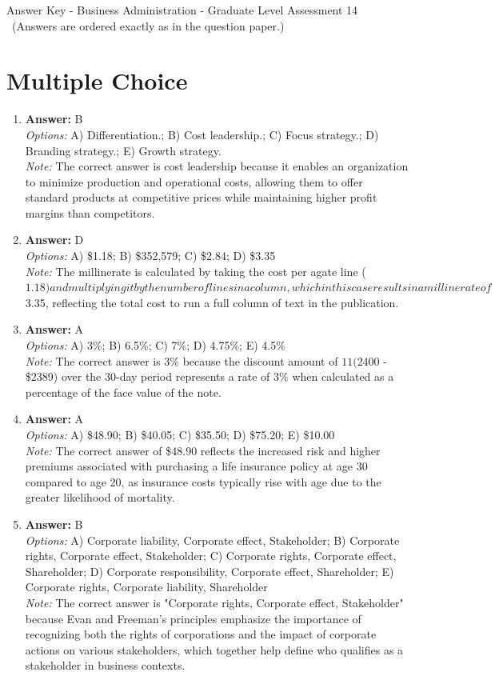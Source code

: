 \documentclass[12pt]{article}
\begin{document}
\begin{center}
Answer Key - Business Administration - Graduate Level Assessment 14 \
\small (Answers are ordered exactly as in the question paper.)
\end{center}

\section*{Multiple Choice}
\begin{enumerate}[label=\arabic*.]
\item \textbf{Answer:} B
\\ \textit{Options:} A) Differentiation.; B) Cost leadership.; C) Focus strategy.; D) Branding strategy.; E) Growth strategy.
\\ \textit{Note:} The correct answer is cost leadership because it enables an organization to minimize production and operational costs, allowing them to offer standard products at competitive prices while maintaining higher profit margins than competitors.
\item \textbf{Answer:} D
\\ \textit{Options:} A) \$1.18; B) \$352,579; C) \$2.84; D) \$3.35
\\ \textit{Note:} The millinerate is calculated by taking the cost per agate line ($1.18) and multiplying it by the number of lines in a column, which in this case results in a millinerate of $3.35, reflecting the total cost to run a full column of text in the publication.
\item \textbf{Answer:} A
\\ \textit{Options:} A) 3\%; B) 6.5\%; C) 7\%; D) 4.75\%; E) 4.5\%
\\ \textit{Note:} The correct answer is 3\% because the discount amount of $11 ($2400 - \$2389) over the 30-day period represents a rate of 3\% when calculated as a percentage of the face value of the note.
\item \textbf{Answer:} A
\\ \textit{Options:} A) \$48.90; B) \$40.05; C) \$35.50; D) \$75.20; E) \$10.00
\\ \textit{Note:} The correct answer of \$48.90 reflects the increased risk and higher premiums associated with purchasing a life insurance policy at age 30 compared to age 20, as insurance costs typically rise with age due to the greater likelihood of mortality.
\item \textbf{Answer:} B
\\ \textit{Options:} A) Corporate liability, Corporate effect, Stakeholder; B) Corporate rights, Corporate effect, Stakeholder; C) Corporate rights, Corporate effect, Shareholder; D) Corporate responsibility, Corporate effect, Shareholder; E) Corporate rights, Corporate liability, Shareholder
\\ \textit{Note:} The correct answer is "Corporate rights, Corporate effect, Stakeholder" because Evan and Freeman's principles emphasize the importance of recognizing both the rights of corporations and the impact of corporate actions on various stakeholders, which together help define who qualifies as a stakeholder in business contexts.
\end{enumerate}
\end{document}

